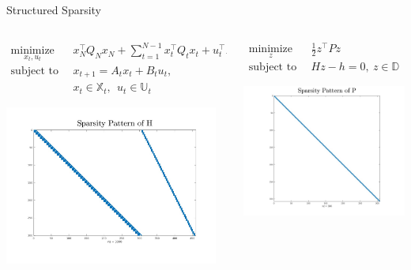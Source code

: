 \documentclass[aspectratio=169]{beamer}
\begin{document}
\begin{frame}{Structured Sparsity}
    \vspace{-0.8cm}
    \begin{columns}[T]
        \begin{column}{.55\textwidth}
            \begin{fleqn}
            \begin{equation*}
            \begin{aligned}
    \underset{x_t,u_t}{\operatorname{minimize}}~~~&~x_N^\top Q_N x_N+\sum_{t=1}^{N-1} x_t^\top Q_t x_t + u_t^\top R_t u_t\\
    \operatorname{subject~to}~&~x_{t+1} = A_t x_t + B_tu_t, \\
    &~x_t\in\mathbb{X}_t,~~u_t \in \mathbb{U}_t
            \end{aligned}
            \end{equation*}
            \end{fleqn}
            \includegraphics[width=7cm]{img/H_spy.jpg}
    \end{column}
        \begin{column}{.45\textwidth}
            \begin{fleqn}
            \begin{equation*}
            \begin{aligned}
        \underset{z}{\operatorname{minimize}}~~~&~\frac{1}{2}z^\top P z \\
        \operatorname{subject~to}~&~Hz-h=0,~ z\in\mathbb{D}
            \end{aligned}
            \end{equation*}
            \end{fleqn}

            \vspace{1.15cm}

        \includegraphics[width=6cm]{img/P_spy.jpg}
        \end{column}
    \end{columns}
\end{frame}
\end{document}
